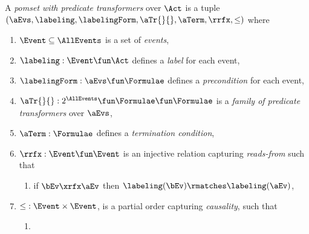\begin{definition}
  \label{def:pomset}
  A \emph{pomset with predicate transformers} over $\Act$
  is a tuple $(\aEvs, \labeling, \labelingForm, \aTr{}{}, \aTerm, {\rrfx}, {\le})$ where
  \begin{enumerate}[,label=(\textsc{m}\arabic*),ref=\textsc{m}\arabic*]
  \item \label{pom-E}
    $\Event\subseteq\AllEvents$ is a set of \emph{events},
  \item \label{pom-lambda}
    $\labeling: \Event \fun \Act$ defines a \emph{label} for each event,
  \item \label{pom-kappa}
    $\labelingForm:\aEvs\fun\Formulae$ defines a \emph{precondition} for each event,
  \item \label{pom-tau}
    $\aTr{}{}:2^{\AllEvents}\fun\Formulae \fun\Formulae$ is a \emph{family of
      predicate transformers} over $\aEvs$, %
  \item \label{pom-term}
    $\aTerm:\Formulae$ defines a \emph{termination condition},
  \item \label{pom-rf}
    ${\rrfx} : \Event\fun\Event$ is an injective relation capturing
    \emph{reads-from} such that 
    \begin{enumerate}
    \item \label{rf-match}
      if $\bEv\xrfx\aEv$ then $\labeling(\bEv) \rmatches \labeling(\aEv)$,
    \end{enumerate}
  \item \label{pom-le}
    ${\le} : \Event\times\Event$, is a partial order capturing
    \emph{causality}, such that
    \begin{enumerate}
      \item \label{rf-block}

\end{enumerate}
\end{enumerate}
\end{definition}

